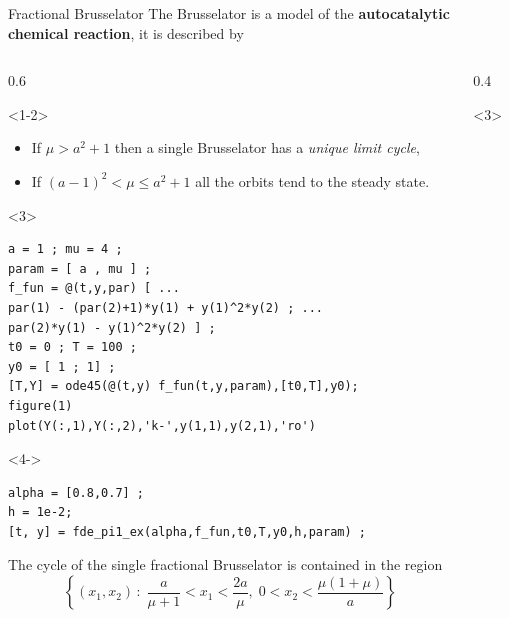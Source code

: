 \documentclass[aspectratio=169,xcolor=dvipsnames]{beamer}
\begin{document}
\begin{frame}[fragile]{Fractional Brusselator}
The Brusselator is a model of the \textbf{autocatalytic chemical reaction}, it is described by
\vspace{-1em}
\begin{columns}
\begin{column}{0.6\columnwidth}
\begin{onlyenv}<1-2>
\begin{itemize}
	\item<1-> If $\mu > a^2 + 1$ then a single Brusselator has a \emph{unique limit cycle},
	\item<2-> If $(a-1)^2 < \mu \leq a^2 + 1$ all the orbits tend to the steady state.
\end{itemize}
\end{onlyenv}
\begin{onlyenv}<3>
\begin{verbatim}
a = 1 ; mu = 4 ;
param = [ a , mu ] ;
f_fun = @(t,y,par) [ ...
par(1) - (par(2)+1)*y(1) + y(1)^2*y(2) ; ...
par(2)*y(1) - y(1)^2*y(2) ] ;
t0 = 0 ; T = 100 ;
y0 = [ 1 ; 1] ;
[T,Y] = ode45(@(t,y) f_fun(t,y,param),[t0,T],y0);
figure(1)
plot(Y(:,1),Y(:,2),'k-',y(1,1),y(2,1),'ro')
\end{verbatim}
\end{onlyenv}
\begin{onlyenv}<4->
\begin{verbatim}
alpha = [0.8,0.7] ;
h = 1e-2;
[t, y] = fde_pi1_ex(alpha,f_fun,t0,T,y0,h,param) ;
\end{verbatim}

The cycle of the single fractional Brusselator is contained in the region
\[
\left\lbrace (x_1,x_2) \,:\; \frac{a}{\mu+1} < x_1 < \frac{2a}{\mu}, \; 0 < x_2 < \frac{\mu(1+\mu)}{a} \right\rbrace
\]
\end{onlyenv}
\end{column}
\begin{column}{0.4\columnwidth}
\begin{onlyenv}<3>
\centering


\end{onlyenv}
\end{column}
\end{columns}
\end{frame}
\end{document}
